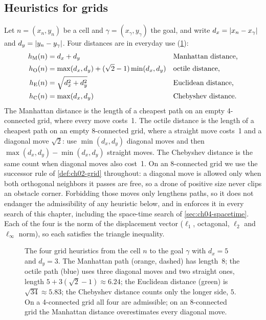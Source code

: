 \subsection{Heuristics for grids}
\label{sec:ch04-grid-heuristics}

Let $n = (x_n, y_n)$ be a cell and $\gamma = (x_\gamma, y_\gamma)$ the goal, and
write $d_x = \left\lvert x_n - x_\gamma \right\rvert$ and $d_y = \left\lvert y_n - y_\gamma \right\rvert$. Four
distances are in everyday use (\cref{fig:ch04-heuristics}):
\begin{align}
  \hcost_{\mathrm{M}}(n) &= d_x + d_y
    && \text{Manhattan distance,}\index{heuristic!Manhattan} \label{eq:ch04-manhattan}\\
  \hcost_{\mathrm{O}}(n) &= \max(d_x, d_y) + (\sqrt{2} - 1)\min(d_x, d_y)
    && \text{octile distance,}\index{heuristic!octile} \label{eq:ch04-octile}\\
  \hcost_{\mathrm{E}}(n) &= \sqrt{d_x^2 + d_y^2}
    && \text{Euclidean distance,}\index{heuristic!Euclidean} \label{eq:ch04-euclid}\\
  \hcost_{\mathrm{C}}(n) &= \max(d_x, d_y)
    && \text{Chebyshev distance.}\index{heuristic!Chebyshev} \label{eq:ch04-chebyshev}
\end{align}
The Manhattan distance is the length of a cheapest path on an empty
4-connected grid, where every move costs~1. The octile distance is the length
of a cheapest path on an empty 8-connected grid, where a straight move costs~1
and a diagonal move $\sqrt{2}$: use $\min(d_x, d_y)$ diagonal moves and then
$\max(d_x, d_y) - \min(d_x, d_y)$ straight moves. The Chebyshev distance is the
same count when diagonal moves also cost~1. On an 8-connected grid we use the
successor rule of \cref{def:ch02-grid} throughout: a diagonal move is allowed
only when both orthogonal neighbors it passes are free, so a drone of positive
size never clips an obstacle corner. Forbidding those moves only lengthens
paths, so it does not endanger the admissibility of any heuristic below, and
 in  enforces it in every search
of this chapter, including the space-time search of
\cref{sec:ch04-spacetime}. Each of the four is the norm of the
displacement vector ($\ell_1$, octagonal, $\ell_2$ and $\ell_\infty$ norm), so
each satisfies the triangle inequality.

\begin{figure}[tb]
  \centering
  \caption{The four grid heuristics from the cell $n$ to the goal $\gamma$ with
  $d_x = 5$ and $d_y = 3$. The Manhattan path (orange, dashed) has length~8; the
  octile path (blue) uses three diagonal moves and two straight ones, length
  $5 + 3(\sqrt{2} - 1) \approx 6.24$; the Euclidean distance (green) is
  $\sqrt{34} \approx 5.83$; the Chebyshev distance counts only the longer side,
  $5$. On a 4-connected grid all four are admissible; on an 8-connected grid the
  Manhattan distance overestimates every diagonal move.}
  \label{fig:ch04-heuristics}
\end{figure}

